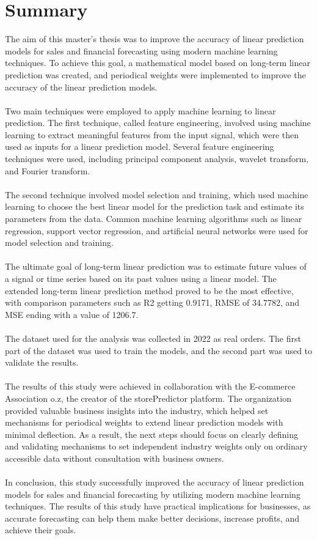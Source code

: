 
\chapter{Summary} \label{summary}
The aim of this master's thesis was to improve the accuracy of linear prediction models for sales
and financial forecasting using modern machine learning techniques. To achieve this goal, a mathematical
model based on long-term linear prediction was created, and periodical weights were implemented
to improve the accuracy of the linear prediction models.\\
\\
Two main techniques were employed to apply machine learning to linear prediction. The first technique,
called feature engineering, involved using machine learning to extract meaningful features from
the input signal, which were then used as inputs for a linear prediction model. Several feature
engineering techniques were used, including principal component analysis, wavelet transform, and
Fourier transform.\\
\\
The second technique involved model selection and training, which used machine learning to choose
the best linear model for the prediction task and estimate its parameters from the data. Common machine
learning algorithms such as linear regression, support vector regression, and artificial neural networks
were used for model selection and training.\\
\\
The ultimate goal of long-term linear prediction was to estimate future values of a signal or time
series based on its past values using a linear model. The extended long-term linear prediction method
proved to be the most effective, with comparison parameters such as R2 getting 0.9171, RMSE of 34.7782, and MSE ending
with a value of 1206.7.\\
\\
The dataset used for the analysis was collected in 2022 as real orders. The first part of the dataset
was used to train the models, and the second part was used to validate the results.\\
\\
The results of this study were achieved in collaboration with the E-commerce Association o.z,
the creator of the storePredictor platform. The organization provided valuable business insights into
the industry, which helped set mechanisms for periodical weights to extend linear prediction models
with minimal deflection. As a result, the next steps should focus on clearly defining and validating
mechanisms to set independent industry weights only on ordinary accessible data without consultation
with business owners.\\
\\
In conclusion, this study successfully improved the accuracy of linear prediction models for sales
and financial forecasting by utilizing modern machine learning techniques. The results of this study
have practical implications for businesses, as accurate forecasting can help them make better decisions,
increase profits, and achieve their goals.

